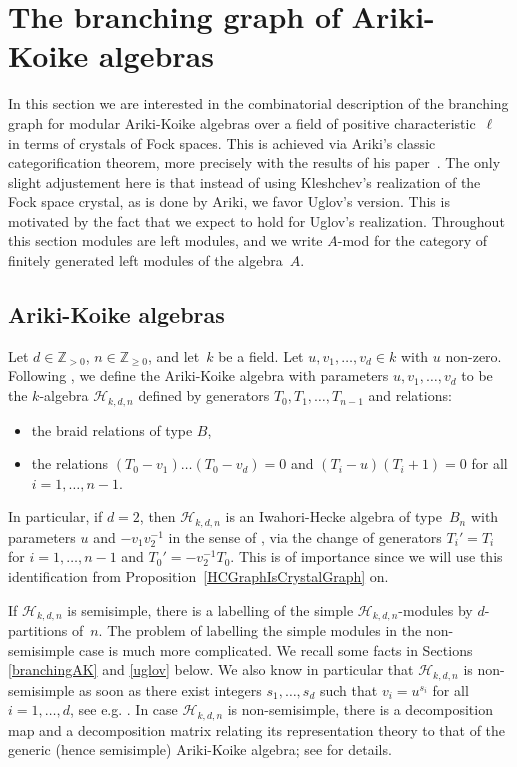 \documentclass[twoside,12pt]{amsart}
\theoremstyle{plain}
\begin{document}
\section{The branching graph of Ariki-Koike algebras}
\label{BranchingCyclotomicHecke}

In this section we are interested in the combinatorial description of the 
branching graph for modular Ariki-Koike algebras over a field of positive 
characteristic~$\ell$ in terms of crystals of Fock spaces. This is achieved via Ariki's 
classic categorification theorem, more precisely with the results of his 
paper~\cite{Ariki2007}. The only slight adjustement here is that instead of 
using Kleshchev's realization of the Fock space crystal, as is done by Ariki,
we favor Uglov's version. This is motivated by the fact that we expect 
\cite[Conjecture 5.7]{GerberHissJacon2014} to hold for Uglov's realization.
Throughout this section modules are left modules, and we write $A$-mod for
the category of finitely generated left modules of the algebra~$A$.

\subsection{Ariki-Koike algebras}
\label{defAKalgebra}

Let $d\in{\mathbb{Z}}_{>0}$, $n\in{\mathbb{Z}}_{\geq0}$, and let~$k$ be a field. Let $u,v_1, \dots ,
v_d \in k$ with $u$ non-zero. Following \cite{Mathas2004}, we define the 
Ariki-Koike algebra with parameters $u,v_1,\dots,v_d$ to be the $k$-algebra 
${\mathcal{H}}_{k,d,n}$ defined by generators $T_0, T_1, \dots, T_{n-1}$ and relations:
\begin{itemize}
\item the braid relations of type $B$,
\item the relations $(T_0-v_1) \dots (T_0-v_d)=0$ and 
$(T_i-u)(T_i+1)=0$ for all $i = 1, \dots , n-1$.
\end{itemize}
In particular, if $d=2$, then ${\mathcal{H}}_{k,d,n}$ is an Iwahori-Hecke algebra of 
type~$B_n$ with parameters $u$ and $-v_1v_2^{-1}$ in the sense of 
\cite[Definition~$4.4.1$ and Remark~$8.1.3$]{GeckPfeiffer2000}, via the change 
of generators $T_i'= T_i$ for $i=1,\dots,n-1$ and $T_0'=- v_2^{-1} T_0$.
This is of importance since we will use this identification from 
Proposition~\ref{HCGraphIsCrystalGraph} on.

If ${\mathcal{H}}_{k,d,n}$ is semisimple, there is a labelling of the simple 
${\mathcal{H}}_{k,d,n}$-modules by $d$-partitions of~$n$. The problem of labelling 
the simple modules in the non-semisimple case is much more complicated.
We recall some facts in Sections \ref{branchingAK} and \ref{uglov} below.
We also know in particular that ${\mathcal{H}}_{k,d,n}$ is non-semisimple as soon as 
there exist integers $s_1,\dots, s_d$ such that $v_i=u^{s_i}$ for all 
$i=1,\dots,d$, see e.g. \cite[Corollary 3.3]{Mathas2004}. In case
${\mathcal{H}}_{k,d,n}$ is non-semisimple, there is a decomposition map and a 
decomposition matrix relating its representation theory to that of the 
generic (hence semisimple) Ariki-Koike algebra; see 
\cite[Sections 13.3 and 13.4]{Ariki2002} for details.
\end{document}
